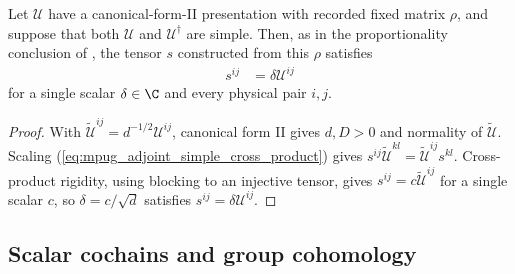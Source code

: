 \begin{lemma}
    \label{thm:mpug_adjoint_simple_scalar}
    \leanok
    Let $\mathcal U$ have a canonical-form-II presentation with recorded
    fixed matrix $\rho$, and suppose that both $\mathcal U$ and
    $\mathcal U^\dagger$ are simple. Then, as in the proportionality
    conclusion of \cite[lines~1255--1325]{FrancoRubio2025MPUGauging}, the
    tensor $s$ constructed from this $\rho$ satisfies
    \begin{align}
        s^{ij} & =\delta\mathcal U^{ij}
    \end{align}
    for a single scalar $\delta\in\C$ and every physical pair $i,j$.
\end{lemma}

\begin{proof}\leanok
    With $\widetilde{\mathcal U}^{ij}=d^{-1/2}\mathcal U^{ij}$,
    canonical form II gives $d,D>0$ and normality of
    $\widetilde{\mathcal U}$. Scaling
    (\ref{eq:mpug_adjoint_simple_cross_product}) gives
    $s^{ij}\widetilde{\mathcal U}^{kl}
        =\widetilde{\mathcal U}^{ij}s^{kl}$.
    Cross-product rigidity, using blocking to an injective tensor, gives
    $s^{ij}=c\widetilde{\mathcal U}^{ij}$ for a single scalar $c$, so
    $\delta=c/\sqrt d$ satisfies $s^{ij}=\delta\mathcal U^{ij}$.
\end{proof}

\subsection{Scalar cochains and group cohomology}

